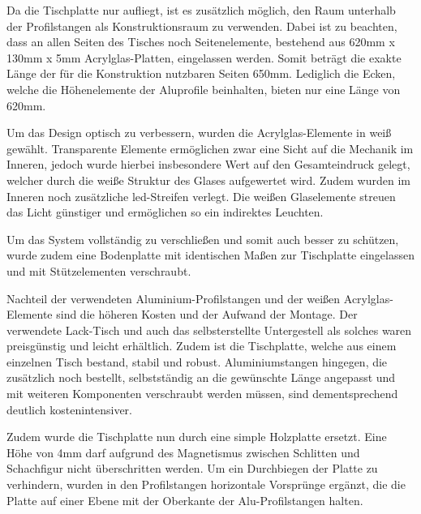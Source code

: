 Da die Tischplatte nur aufliegt, ist es zusätzlich möglich, den Raum
unterhalb der Profilstangen als Konstruktionsraum zu verwenden. Dabei
ist zu beachten, dass an allen Seiten des Tisches noch Seitenelemente,
bestehend aus 620mm x 130mm x 5mm Acrylglas-Platten, eingelassen werden.
Somit beträgt die exakte Länge der für die Konstruktion nutzbaren Seiten
650mm. Lediglich die Ecken, welche die Höhenelemente der Aluprofile
beinhalten, bieten nur eine Länge von 620mm.

Um das Design optisch zu verbessern, wurden die Acrylglas-Elemente in
weiß gewählt. Transparente Elemente ermöglichen zwar eine Sicht auf die
Mechanik im Inneren, jedoch wurde hierbei insbesondere Wert auf den
Gesamteindruck gelegt, welcher durch die weiße Struktur des Glases
aufgewertet wird. Zudem wurden im Inneren noch zusätzliche
\gls{led}-Streifen verlegt. Die weißen Glaselemente streuen das Licht
günstiger und ermöglichen so ein indirektes Leuchten.

Um das System vollständig zu verschließen und somit auch besser zu
schützen, wurde zudem eine Bodenplatte mit identischen Maßen zur
Tischplatte eingelassen und mit Stützelementen verschraubt.

Nachteil der verwendeten Aluminium-Profilstangen und der weißen
Acrylglas-Elemente sind die höheren Kosten und der Aufwand der Montage.
Der verwendete Lack-Tisch und auch das selbsterstellte Untergestell als
solches waren preisgünstig und leicht erhältlich. Zudem ist die
Tischplatte, welche aus einem einzelnen Tisch bestand, stabil und
robust. Aluminiumstangen hingegen, die zusätzlich noch bestellt,
selbstständig an die gewünschte Länge angepasst und mit weiteren
Komponenten verschraubt werden müssen, sind dementsprechend deutlich
kostenintensiver.

Zudem wurde die Tischplatte nun durch eine simple Holzplatte ersetzt.
Eine Höhe von 4mm darf aufgrund des Magnetismus zwischen Schlitten und
Schachfigur nicht überschritten werden. Um ein Durchbiegen der Platte zu
verhindern, wurden in den Profilstangen horizontale Vorsprünge ergänzt,
die die Platte auf einer Ebene mit der Oberkante der Alu-Profilstangen
halten.

